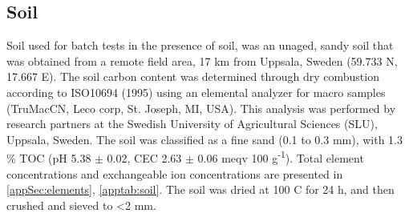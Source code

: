 \begin{table}
    \caption{Spike concentrations (SC) in $\mathrm{\mu g/L}$ used for the batch tests, corrected for the analytical standards.}
    \label{tab:spikeConcentrations}
\end{table} 

\subsection{Soil}
Soil used for batch tests in the presence of soil, was an unaged, sandy soil that was obtained from a remote field area, 17 km from Uppsala, Sweden (59.733 N, 17.667 E). The soil carbon content was determined through dry combustion according to ISO10694 (1995) using an elemental analyzer for macro samples (TruMac\textregistered CN, Leco corp, St. Joseph, MI, USA). This analysis was performed by research partners at the Swedish University of Agricultural Sciences (SLU), Uppsala, Sweden. The soil was classified as a fine sand (0.1 to 0.3 mm), with 1.3 \% TOC (pH 5.38 $\pm$ 0.02, CEC 2.63 $\pm$ 0.06 meqv 100 g\textsuperscript{-1}). Total element concentrations and exchangeable ion concentrations are presented in \cref{appSec:elements}, \cref{apptab:soil}. The soil was dried at 100 \textdegree C for 24 h, and then crushed and sieved to \textless 2 mm. 

